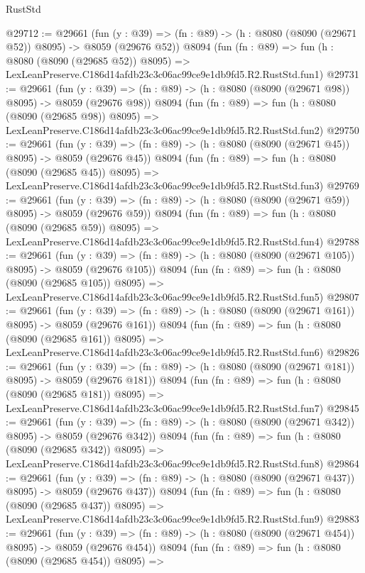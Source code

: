\begin{lexlean}{RustStd}
\begin{coremodule}
@29712 := @29661
    (fun (y : @39) => (fn : @89) -> (h : @8080 (@8090 (@29671 @52)) @8095) -> @8059 (@29676 @52))
    @8094
    (fun (fn : @89) =>
    fun (h : @8080 (@8090 (@29685 @52)) @8095) =>
    LexLeanPreserve.C186d14afdb23c3c06ac99ce9e1db9fd5.R2.RustStd.fun1)
@29731 := @29661
    (fun (y : @39) => (fn : @89) -> (h : @8080 (@8090 (@29671 @98)) @8095) -> @8059 (@29676 @98))
    @8094
    (fun (fn : @89) =>
    fun (h : @8080 (@8090 (@29685 @98)) @8095) =>
    LexLeanPreserve.C186d14afdb23c3c06ac99ce9e1db9fd5.R2.RustStd.fun2)
@29750 := @29661
    (fun (y : @39) => (fn : @89) -> (h : @8080 (@8090 (@29671 @45)) @8095) -> @8059 (@29676 @45))
    @8094
    (fun (fn : @89) =>
    fun (h : @8080 (@8090 (@29685 @45)) @8095) =>
    LexLeanPreserve.C186d14afdb23c3c06ac99ce9e1db9fd5.R2.RustStd.fun3)
@29769 := @29661
    (fun (y : @39) => (fn : @89) -> (h : @8080 (@8090 (@29671 @59)) @8095) -> @8059 (@29676 @59))
    @8094
    (fun (fn : @89) =>
    fun (h : @8080 (@8090 (@29685 @59)) @8095) =>
    LexLeanPreserve.C186d14afdb23c3c06ac99ce9e1db9fd5.R2.RustStd.fun4)
@29788 := @29661
    (fun (y : @39) => (fn : @89) -> (h : @8080 (@8090 (@29671 @105)) @8095) -> @8059 (@29676 @105))
    @8094
    (fun (fn : @89) =>
    fun (h : @8080 (@8090 (@29685 @105)) @8095) =>
    LexLeanPreserve.C186d14afdb23c3c06ac99ce9e1db9fd5.R2.RustStd.fun5)
@29807 := @29661
    (fun (y : @39) => (fn : @89) -> (h : @8080 (@8090 (@29671 @161)) @8095) -> @8059 (@29676 @161))
    @8094
    (fun (fn : @89) =>
    fun (h : @8080 (@8090 (@29685 @161)) @8095) =>
    LexLeanPreserve.C186d14afdb23c3c06ac99ce9e1db9fd5.R2.RustStd.fun6)
@29826 := @29661
    (fun (y : @39) => (fn : @89) -> (h : @8080 (@8090 (@29671 @181)) @8095) -> @8059 (@29676 @181))
    @8094
    (fun (fn : @89) =>
    fun (h : @8080 (@8090 (@29685 @181)) @8095) =>
    LexLeanPreserve.C186d14afdb23c3c06ac99ce9e1db9fd5.R2.RustStd.fun7)
@29845 := @29661
    (fun (y : @39) => (fn : @89) -> (h : @8080 (@8090 (@29671 @342)) @8095) -> @8059 (@29676 @342))
    @8094
    (fun (fn : @89) =>
    fun (h : @8080 (@8090 (@29685 @342)) @8095) =>
    LexLeanPreserve.C186d14afdb23c3c06ac99ce9e1db9fd5.R2.RustStd.fun8)
@29864 := @29661
    (fun (y : @39) => (fn : @89) -> (h : @8080 (@8090 (@29671 @437)) @8095) -> @8059 (@29676 @437))
    @8094
    (fun (fn : @89) =>
    fun (h : @8080 (@8090 (@29685 @437)) @8095) =>
    LexLeanPreserve.C186d14afdb23c3c06ac99ce9e1db9fd5.R2.RustStd.fun9)
@29883 := @29661
    (fun (y : @39) => (fn : @89) -> (h : @8080 (@8090 (@29671 @454)) @8095) -> @8059 (@29676 @454))
    @8094
    (fun (fn : @89) =>
    fun (h : @8080 (@8090 (@29685 @454)) @8095) =>

\end{coremodule}
\end{lexlean}
